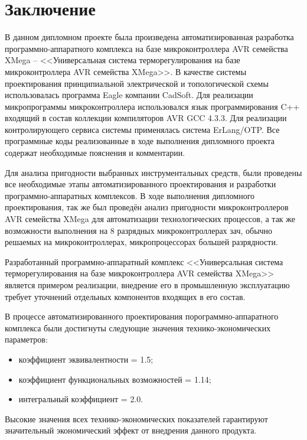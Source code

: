 \section*{Заключение}

В данном дипломном проекте была произведена автоматизированная разработка программно-аппаратного
комплекса на базе микроконтроллера AVR семейства XMega -- <<Универсальная система терморегулирования
на базе микроконтроллера AVR семейства XMega>>. В качестве системы проектирования принципиальной электрической
и топологической схемы использовалась программа Eagle компании CadSoft. Для реализации микропрограммы
микроконтроллера использовался язык программирования C++ входящий в состав коллекции компиляторов AVR GCC 4.3.3.
Для реализации контролирующего сервиса системы применялась система ErLang/OTP. Все программные коды
реализованные в ходе выполнения дипломного проекта содержат необходимые пояснения и комментарии.

Для анализа пригодности выбранных инструментальных средств, 
были проведены все необходимые этапы автоматизированного проектирования и разработки
программно-аппаратных комплексов. В ходе выполнения дипломного проектирования, так же был
проведён анализ пригодности микроконтроллеров AVR семейства XMega для автоматизации
технологических процессов, а так же возможности выполнения на 8 разрядных микроконтроллерах
зач, обычно решаемых на микроконтроллерах, микропроцессорах большей разрядности.

Разработанный программно-аппаратный комплекс <<Универсальная система терморегулирования на базе микроконтроллера
AVR семейства XMega>> является примером реализации, внедрение его в промышленную эксплуатацию
требует уточнений отдельных компонентов входящих в его состав.


В процессе автоматизированного проектирования порограммно-аппаратного комплекса были
достигнуты следующие  значения технико-экономических параметров:
\begin{itemize}
	\item коэффициент эквивалентности = 1.5;
	\item коэффициент функциональных возможностей = 1.14;
	\item интегральный коэффициент = 2.0.
\end{itemize}
Высокие значения всех технико-экономических показателей гарантируют значительный
экономический эффект от внедрения данного продукта.